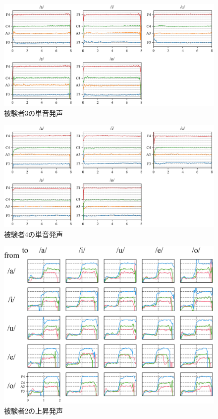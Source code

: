 \documentclass[10.5ptj,a4j,dvipdfmx,uplatex, oneside, openany, report]{jsbook}%
\begin{document}
\begin{figure}[htbp]
    \begin{center}
      \includegraphics[clip,width=12.0cm]{F0_long_3.png}
      \caption{被験者3の単音発声}
      \label{fig:3}
    \end{center}

\end{figure}

\begin{figure}[htbp]
    \begin{center}
      \includegraphics[clip,width=12.0cm]{F0_long_4.png}
      \caption{被験者4の単音発声}
      \label{fig:4}
    \end{center}
\end{figure}





\begin{figure}[htbp]
    \begin{center}
      \includegraphics[clip,width=12.0cm]{up2.png}
      \caption{被験者2の上昇発声}
      \label{fig:u2}
    \end{center}
\end{figure}
\end{document}
